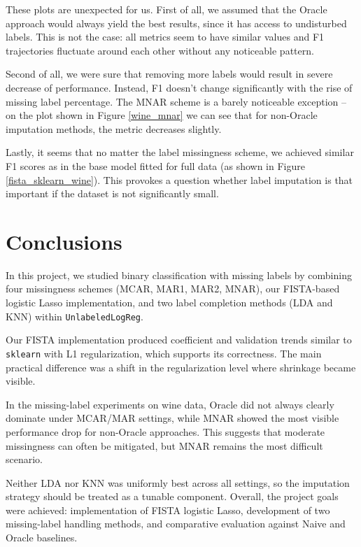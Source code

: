 \documentclass{article}
\begin{document}
These plots are unexpected for us. First of all, we assumed that the Oracle approach would always yield the best results, since it has access to undisturbed labels. This is not the case: all metrics seem to have similar values and F1 trajectories fluctuate around each other without any noticeable pattern.

Second of all, we were sure that removing more labels would result in severe decrease of performance. Instead, F1 doesn't change significantly with the rise of missing label percentage. The MNAR scheme is a barely noticeable exception -- on the plot shown in Figure \ref{wine_mnar} we can see that for non-Oracle imputation methods, the metric decreases slightly.

Lastly, it seems that no matter the label missingness scheme, we achieved similar F1 scores as in the base model fitted for full data (as shown in Figure \ref{fista_sklearn_wine}). This provokes a question whether label imputation is that important if the dataset is not significantly small. 

\section{Conclusions}

In this project, we studied binary classification with missing labels by combining four missingness schemes (MCAR, MAR1, MAR2, MNAR), our FISTA-based logistic Lasso implementation, and two label completion methods (LDA and KNN) within \verb|UnlabeledLogReg|.

Our FISTA implementation produced coefficient and validation trends similar to \verb|sklearn| with L1 regularization, which supports its correctness. The main practical difference was a shift in the regularization level where shrinkage became visible.

In the missing-label experiments on wine data, Oracle did not always clearly dominate under MCAR/MAR settings, while MNAR showed the most visible performance drop for non-Oracle approaches. This suggests that moderate missingness can often be mitigated, but MNAR remains the most difficult scenario.

Neither LDA nor KNN was uniformly best across all settings, so the imputation strategy should be treated as a tunable component. Overall, the project goals were achieved: implementation of FISTA logistic Lasso, development of two missing-label handling methods, and comparative evaluation against Naive and Oracle baselines.
\end{document}
